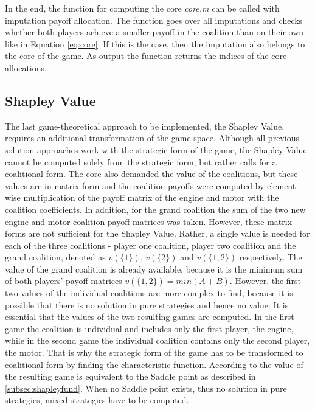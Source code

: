In the end, the function for computing the core \textit{core.m} can be called with imputation payoff allocation. The function goes over all imputations and checks whether both players achieve a smaller payoff in the coalition than on their own like in Equation \ref{eq:core}. If this is the case, then the imputation also belongs to the core of the game. As output the function returns the indices of the core allocations.

\subsection{Shapley Value}
\label{subsec:shapleyimpl}
The last game-theoretical approach to be implemented, the Shapley Value, requires an additional transformation of the game space. Although all previous solution approaches work with the strategic form of the game, the Shapley Value cannot be computed solely from the strategic form, but rather calls for a coalitional form. The core also demanded the value of the coalitions, but these values are in matrix form and the coalition payoffs were computed by element-wise multiplication of the payoff matrix of the engine and motor with the coalition coefficients. In addition, for the grand coalition the sum of the two new engine and motor coalition payoff matrices was taken. However, these matrix forms are not sufficient for the Shapley Value. Rather, a single value is needed for each of the three coalitions - player one coalition, player two coalition and the grand coalition, denoted as $v(\{1\})$, $v(\{2\})$ and $v(\{1,2\})$ respectively. The value of the grand coalition is already available, because it is the minimum sum of both players' payoff matrices $v(\{1,2\}) = min(A+B)$. However, the first two values of the individual coalitions are more complex to find, because it is possible that there is no solution in pure strategies and hence no value. It is essential that the values of the two resulting games are computed. In the first game the coalition is individual and includes only the first player, the engine, while in the second game the individual coalition contains only the second player, the motor. That is why the strategic form of the game has to be transformed to coalitional form by finding the characteristic function. According to \citet{ferguson2014game} the value of the resulting game is equivalent to the Saddle point as described in \ref{subsec:shapleyfund}. When no Saddle point exists, thus no solution in pure strategies, mixed strategies have to be computed.

